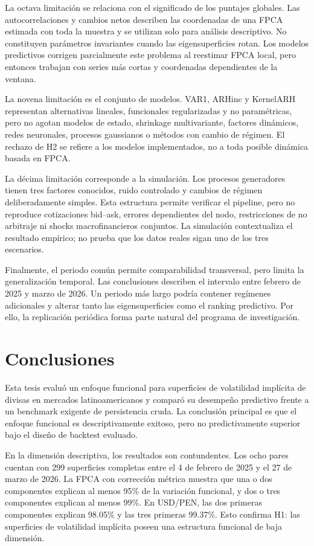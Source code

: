\documentclass[a4paper,11pt]{article}
\newcommand{\SVIs}{superficies de volatilidad implícita}
\begin{document}
La octava limitación se relaciona con el significado de los puntajes globales. Las autocorrelaciones y cambios netos describen las coordenadas de una FPCA estimada con toda la muestra y se utilizan solo para análisis descriptivo. No constituyen parámetros invariantes cuando las eigensuperficies rotan. Los modelos predictivos corrigen parcialmente este problema al reestimar FPCA local, pero entonces trabajan con series más cortas y coordenadas dependientes de la ventana.

La novena limitación es el conjunto de modelos. VAR1, ARHinc y KernelARH representan alternativas lineales, funcionales regularizadas y no paramétricas, pero no agotan modelos de estado, shrinkage multivariante, factores dinámicos, redes neuronales, procesos gaussianos o métodos con cambio de régimen. El rechazo de H2 se refiere a los modelos implementados, no a toda posible dinámica basada en FPCA.

La décima limitación corresponde a la simulación. Los procesos generadores tienen tres factores conocidos, ruido controlado y cambios de régimen deliberadamente simples. Esta estructura permite verificar el pipeline, pero no reproduce cotizaciones bid--ask, errores dependientes del nodo, restricciones de no arbitraje ni shocks macrofinancieros conjuntos. La simulación contextualiza el resultado empírico; no prueba que los datos reales sigan uno de los tres escenarios.

Finalmente, el periodo común permite comparabilidad transversal, pero limita la generalización temporal. Las conclusiones describen el intervalo entre febrero de 2025 y marzo de 2026. Un periodo más largo podría contener regímenes adicionales y alterar tanto las eigensuperficies como el ranking predictivo. Por ello, la replicación periódica forma parte natural del programa de investigación.

\section{Conclusiones}

Esta tesis evaluó un enfoque funcional para \SVIs{} de divisas en mercados latinoamericanos y comparó su desempeño predictivo frente a un benchmark exigente de persistencia cruda. La conclusión principal es que el enfoque funcional es descriptivamente exitoso, pero no predictivamente superior bajo el diseño de backtest evaluado.

En la dimensión descriptiva, los resultados son contundentes. Los ocho pares cuentan con 299 superficies completas entre el 4 de febrero de 2025 y el 27 de marzo de 2026. La FPCA con corrección métrica muestra que una o dos componentes explican al menos 95\% de la variación funcional, y dos o tres componentes explican al menos 99\%. En USD/PEN, las dos primeras componentes explican 98.05\% y las tres primeras 99.37\%. Esto confirma H1: las \SVIs{} poseen una estructura funcional de baja dimensión.
\end{document}
